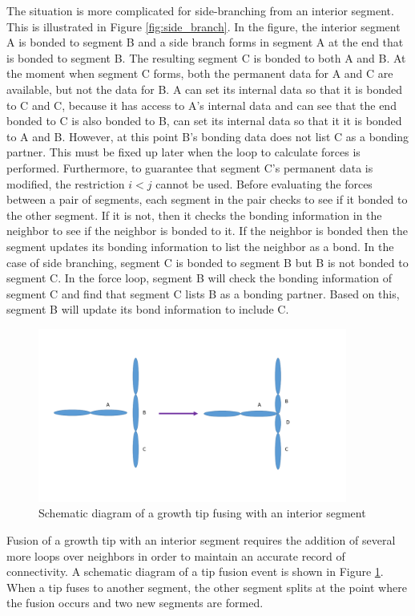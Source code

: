 \documentclass[12pt]{article}
\begin{document}
The situation is more complicated for side-branching from an interior segment. This
is illustrated in Figure \ref{fig:side_branch}. In the figure, the interior segment A is bonded
to segment B and a side branch forms in segment A at the end that is bonded to segment B. The
resulting segment C is bonded to both A and B. At the moment when segment C forms, both the
permanent data for A and C are available, but not the data for B. A can set its internal data
so that it is bonded to C and C, because it has access to A's internal data and can see that the
end bonded to C is also bonded to B, can set its
internal data so that it it is bonded to A and B. However, at this point B's bonding data does
not list C as a bonding partner.
This must be fixed up later when the loop to calculate forces is performed. Furthermore, to
guarantee that segment C's permanent data is modified, the restriction $i<j$ cannot be used.
Before evaluating the forces between a pair of segments, each segment in the pair
checks to see if it bonded to the other segment. If it is not, then it checks the bonding
information in the neighbor to see if the neighbor is bonded to it. If the neighbor is bonded
then the segment updates its bonding information to list the neighbor as a bond. In the case
of side branching, segment C is bonded to segment B but B is not bonded to segment C.
In the force loop, segment B will check the bonding information of segment C and find that
segment C lists B as a bonding partner. Based on this, segment B will update its bond
information to include C.

\begin{figure}
\centering
\includegraphics[width=4.0in,keepaspectratio=true]{fusion}
\caption{\label{fig:fusion} Schematic diagram of a growth tip fusing with an interior segment}
\end{figure}

Fusion of a growth tip with an interior segment requires the addition of several more loops
over neighbors in order to maintain an accurate record of connectivity. A schematic diagram
of a tip fusion event is shown in Figure \ref{fig:fusion}. When a tip fuses to another segment,
the other segment splits at the point where the fusion occurs and two new segments are formed.
\end{document}
